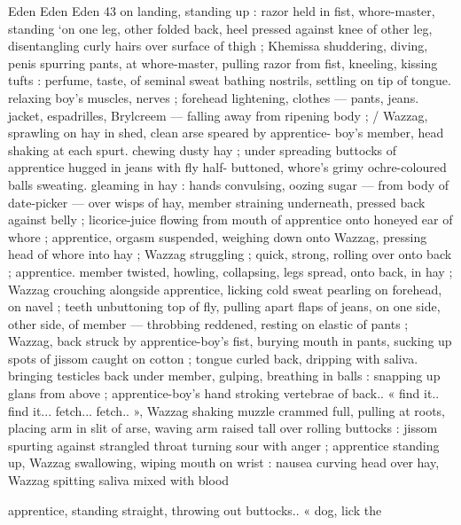 Eden Eden Eden 43
on landing, standing up : razor held in fist, whore-master, standing
‘on one leg, other folded back, heel pressed against knee of other
leg, disentangling curly hairs over surface of thigh ; Khemissa
shuddering, diving, penis spurring pants, at whore-master, pulling
razor from fist, kneeling, kissing tufts : perfume, taste, of seminal
sweat bathing nostrils, settling on tip of tongue. relaxing boy's
muscles, nerves ; forehead lightening, clothes — pants, jeans.
jacket, espadrilles, Brylcreem — falling away from ripening body ; /
Wazzag, sprawling on hay in shed, clean arse speared by apprentice-
boy's member, head shaking at each spurt. chewing dusty hay ;
under spreading buttocks of apprentice hugged in jeans with fly half-
buttoned, whore’s grimy ochre-coloured balls sweating. gleaming in
hay : hands convulsing, oozing sugar — from body of date-picker —
over wisps of hay, member straining underneath, pressed back
against belly ; licorice-juice flowing from mouth of apprentice onto
honeyed ear of whore ; apprentice, orgasm suspended, weighing
down onto Wazzag, pressing head of whore into hay ; Wazzag
struggling ; quick, strong, rolling over onto back ; apprentice.
member twisted, howling, collapsing, legs spread, onto back, in hay
; Wazzag crouching alongside apprentice, licking cold sweat pearling
on forehead, on navel ; teeth unbuttoning top of fly, pulling apart
flaps of jeans, on one side, other side, of member — throbbing
reddened, resting on elastic of pants ; Wazzag, back struck by
apprentice-boy's fist, burying mouth in pants, sucking up spots of
jissom caught on cotton ; tongue curled back, dripping with saliva.
bringing testicles back under member, gulping, breathing in balls :
snapping up glans from above ; apprentice-boy's hand stroking
vertebrae of back.. « find it.. find it... fetch... fetch.. », Wazzag
shaking muzzle crammed full, pulling at roots, placing arm in slit of
arse, waving arm raised tall over rolling buttocks : jissom spurting
against strangled throat turning sour with anger ; apprentice
standing up, Wazzag swallowing, wiping mouth on wrist : nausea
curving head over hay, Wazzag spitting saliva mixed with blood

apprentice, standing straight, throwing out buttocks.. « dog, lick the


